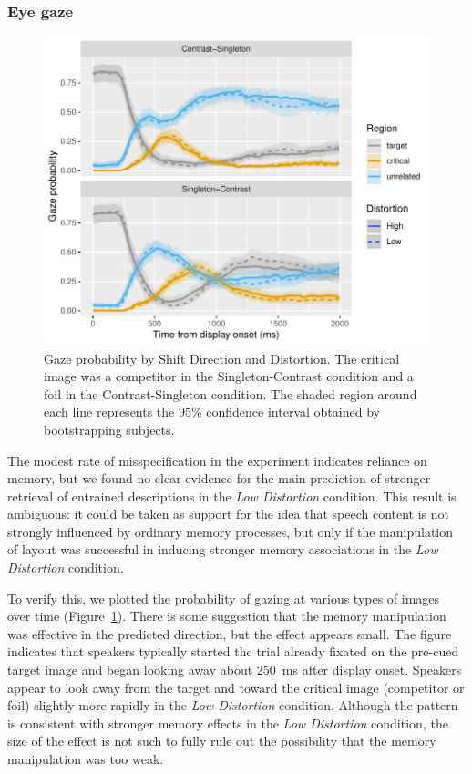 \documentclass[natbib,doc,a4paper]{apa6}
\begin{document}
\subsubsection*{Eye gaze}
\label{sec:org19abb1f}

\begin{figure}[htbp]
\centering
\includegraphics[width=.9\linewidth]{exp1/img/exp1-probplot.pdf}
\caption{\label{fig:org5a0975d}
Gaze probability by Shift Direction and Distortion. The critical image was a competitor in the Singleton-Contrast condition and a foil in the Contrast-Singleton condition. The shaded region around each line represents the 95\% confidence interval obtained by bootstrapping subjects.}
\end{figure}

The modest rate of misspecification in the experiment indicates reliance on memory, but we found no clear evidence for the main prediction of stronger retrieval of entrained descriptions in the \emph{Low Distortion} condition. This result is ambiguous: it could be taken as support for the idea that speech content is not strongly influenced by ordinary memory processes, but only if the manipulation of layout was successful in inducing stronger memory associations in the \emph{Low Distortion} condition.  

To verify this, we plotted the probability of gazing at various types of images over time (Figure~\ref{fig:org5a0975d}).  There is some suggestion that the memory manipulation was effective in the predicted direction, but the effect appears small. The figure indicates that speakers typically started the trial already fixated on the pre-cued target image and began looking away about 250~ms after display onset. Speakers appear to look away from the target and toward the critical image (competitor or foil) slightly more rapidly in the \emph{Low Distortion} condition. Although the pattern is consistent with stronger memory effects in the \emph{Low Distortion} condition, the size of the effect is not such to fully rule out the possibility that the memory manipulation was too weak.
\end{document}
